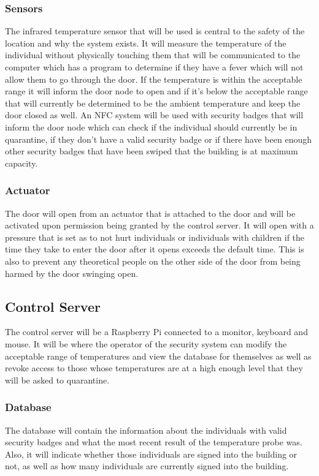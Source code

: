 \subsubsection{Sensors}
The infrared temperature sensor that will be used is central to the safety of the location
and why the system exists. It will measure the temperature of the individual
without physically touching them that will be communicated to the computer which
has a program to determine if they have a fever which will not allow them to go
through the door. If the temperature is within the acceptable range it will
inform the door node to open and if it's below the acceptable range that will
currently be determined to be the ambient temperature and keep the door closed
as well. An NFC system will be used with security badges that will inform the door node
which can check if the individual should currently be in quarantine, if they
don't have a valid security badge or if there have been enough other
security badges that have been
swiped that the building is at maximum capacity.

\subsubsection{Actuator}
The door will open from an actuator that is attached to the door and will be
activated upon permission being granted by the control server. It will open with a
pressure that is set as to not hurt individuals or individuals with children if
the time they take to enter the door after it opens exceeds the default time.
This is also to prevent any theoretical people on the other side of the door
from being harmed by the door swinging open.

\subsection{Control Server}
The control server will be a Raspberry Pi connected to a monitor, keyboard and
mouse. It will be where the operator of the security system can modify the
acceptable range of temperatures and view the database for themselves as well as
revoke access to those whose temperatures are at a high enough level that they
will be asked to quarantine.

\subsubsection{Database}
The database will contain the information about the individuals with valid
security badges and what the most recent result of the temperature probe was.
Also, it will indicate whether those individuals are signed into the building or
not, as well as how many individuals are currently signed into the building.

